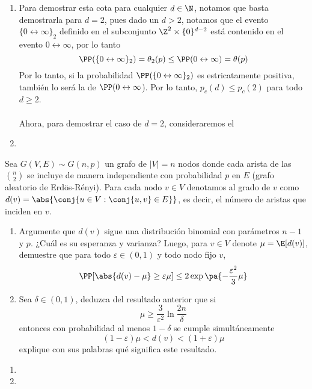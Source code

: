 \begin{solucion}
\begin{enumerate}[label=\alph*)]
	\item Para demostrar esta cota para cualquier $d \in \N$, notamos que basta demostrarla para $d=2$, pues dado un $d>2$, notamos que el evento $\{0\leftrightarrow\infty\}_2$ definido en el subconjunto $\Z^2\times\{0\}^{d-2}$ está contenido en el evento $0\leftrightarrow\infty$, por lo tanto
		\[
			\PP(\{0\leftrightarrow\infty\}_2) = \theta_2(p) \leq \PP(0\leftrightarrow\infty) = \theta(p)
		\]
		Por lo tanto, si la probabilidad $\PP(\{0\leftrightarrow\infty\}_2)$ es estricatamente positiva, también lo será la de $\PP(0\leftrightarrow\infty$). Por lo tanto, $p_c(d) \leq p_c(2)$ para todo $d\geq2$. \\
		\\
		Ahora, para demostrar el caso de $d=2$, consideraremos el 
	\item
	
\end{enumerate}

\end{solucion}

\newpage
\begin{problema}{2}
	Sea $G(V,E) \sim G(n,p)$ un grafo de $|V| = n$	nodos donde cada arista de las $\binom{n}{2}$ se incluye de manera independiente con probabilidad $p$ en $E$ (grafo aleatorio de Erdös-Rényi). Para cada nodo $v\in V$ denotamos al grado de $v$ como $d(v) = \abs{\conj{u\in V: \conj{u,v} \in E}}$, es decir, el número de aristas que inciden en $v$.
	\begin{enumerate}[label=\alph*)]
		\item Argumente que $d(v)$ sigue una distribución binomial con parámetros $n-1$ y $p$. ¿Cuál es su esperanza y varianza? Luego, para $v \in V$ denote $\mu = \E[d(v)]$, demuestre que para todo $\varepsilon \in (0,1)$ y todo nodo fijo $v$,
			\[
				\PP[\abs{d(v) - \mu} \geq \varepsilon\mu] \leq 2\exp\pa{-\frac{\varepsilon^2}{3}\mu}
			\]
		\item Sea $\delta \in (0,1)$, deduzca del resultado anterior que si
			\[
				\mu \geq \frac{3}{\varepsilon^2}\ln\frac{2n}{\delta}
			\]
			entonces con probabilidad al menos $1-\delta$ se cumple simultáneamente
			\[
				(1-\varepsilon)\mu < d(v) < (1+\varepsilon)\mu
			\]
			explique con sus palabras qué significa este resultado.
	\end{enumerate}
\end{problema}
\begin{solucion}
	\begin{enumerate}[label=\alph*)]
		\item
		\item
	\end{enumerate}
\end{solucion}
